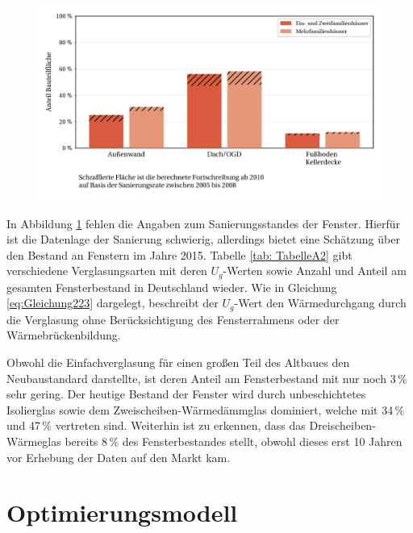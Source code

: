 \begin{figure}[H]
	\centering
		\includegraphics{Pictures/NachtraeglicheSanierung.jpg}
	\caption{\cite{Bigalke.2016}}
	\label{fig: Abbildung231} 
\end{figure}

In Abbildung \ref{fig: Abbildung231} fehlen die Angaben zum Sanierungsstandes der Fenster.
Hierfür ist die Datenlage der Sanierung schwierig, allerdings bietet \cite{Bigalke.2016} eine Schätzung über den Bestand an Fenstern im Jahre 2015.
Tabelle \ref{tab: TabelleA2} gibt verschiedene Verglasungsarten mit deren \(U_g\)-Werten sowie Anzahl und Anteil am gesamten Fensterbestand in Deutschland wieder.
Wie in Gleichung \ref{eq:Gleichung223} dargelegt, beschreibt der \(U_g\)-Wert den Wärmedurchgang durch die Verglasung ohne Berücksichtigung des Fensterrahmens oder der Wärmebrückenbildung.

Obwohl die Einfachverglasung für einen großen Teil des Altbaues den Neubaustandard darstellte, ist deren Anteil am Fensterbestand mit nur noch 3\,\% sehr gering. 
Der heutige Bestand der Fenster wird durch unbeschichtetes Isolierglas sowie dem Zweischeiben-Wärmedämmglas dominiert, welche mit 34\,\% und 47\,\% vertreten sind.
Weiterhin ist zu erkennen, dass das Dreischeiben-Wärmeglas bereits 8\,\% des Fensterbestandes stellt, obwohl dieses erst 10 Jahren vor Erhebung der Daten auf den Markt kam.




\section{Optimierungsmodell}
\label{sec:Sektion 24}














